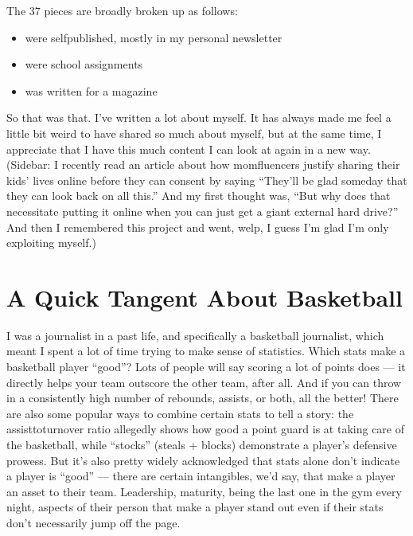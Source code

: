 \documentclass[letterpaper,10pt,english]{jupyterBook}
\begin{document}
\sphinxAtStartPar
The 37 pieces are broadly broken up as follows:
\begin{itemize}
\item {} 
 were self\sphinxhyphen{}published, mostly in my personal newsletter

\item {} 
 were school assignments

\item {} 
 was written for a magazine

\end{itemize}

\sphinxAtStartPar
So that was that. I’ve written a lot about myself. It has always made me feel a little bit weird to have shared so much about myself, but at the same time, I appreciate that I have this much content I can look at again in a new way. (Sidebar: I recently read an article about how momfluencers justify sharing their kids’ lives online before they can consent by saying “They’ll be glad someday that they can look back on all this.” And my first thought was, “But why does that necessitate putting it online when you can just get a giant external hard drive?” And then I remembered this project and went, welp, I guess I’m glad I’m only exploiting myself.)


\section{A Quick Tangent About Basketball}
\label{\detokenize{part1:a-quick-tangent-about-basketball}}
\sphinxAtStartPar
I was a journalist in a past life, and specifically a basketball journalist, which meant I spent a lot of time trying to make sense of statistics. Which stats make a basketball player “good”? Lots of people will say scoring a lot of points does — it directly helps your team outscore the other team, after all. And if you can throw in a consistently high number of rebounds, assists, or both, all the better! There are also some popular ways to combine certain stats to tell a story: the assist\sphinxhyphen{}to\sphinxhyphen{}turnover ratio allegedly shows how good a point guard is at taking care of the basketball, while “stocks” (steals + blocks) demonstrate a player’s defensive prowess. But it’s also pretty widely acknowledged that stats alone don’t indicate a player is “good” — there are certain intangibles, we’d say, that make a player an asset to their team. Leadership, maturity, being the last one in the gym every night, aspects of their person that make a player stand out even if their stats don’t necessarily jump off the page.
\end{document}
